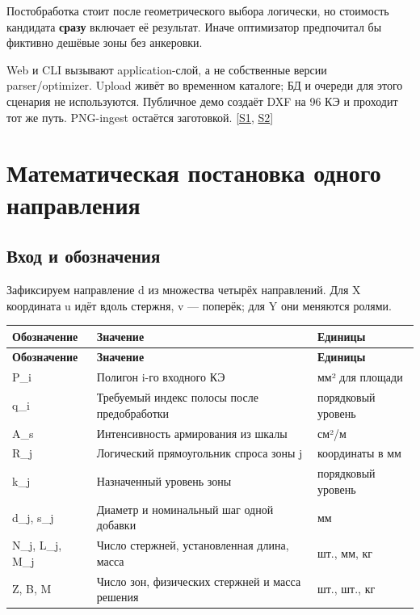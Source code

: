 \documentclass[11pt,a4paper]{article}
\begin{document}
Постобработка стоит после геометрического выбора логически, но стоимость кандидата \textbf{сразу} включает её результат. Иначе оптимизатор предпочитал бы фиктивно дешёвые зоны без анкеровки.


Web и CLI вызывают application-слой, а не собственные версии parser/optimizer. Upload живёт во временном каталоге; БД и очереди для этого сценария не используются. Публичное демо создаёт DXF на 96 КЭ и проходит тот же путь. PNG-ingest остаётся заготовкой. {\color{Teal}\small[\hyperlink{S1}{S1}, \hyperlink{S2}{S2}]}


\section{Математическая постановка одного направления}

\subsection{Вход и обозначения}

Зафиксируем направление d из множества четырёх направлений. Для X координата u идёт вдоль стержня, v — поперёк; для Y они меняются ролями.


{\small\setlength{\tabcolsep}{4pt}
\begin{longtable}{@{}L{41.178mm}L{63.351mm}L{53.848mm}@{}}
\toprule
\textbf{Обозначение} & \textbf{Значение} & \textbf{Единицы} \\
\midrule\endfirsthead
\toprule
\textbf{Обозначение} & \textbf{Значение} & \textbf{Единицы} \\
\midrule\endhead
\bottomrule\endfoot
P\_i & Полигон i-го входного КЭ & мм² для площади \\
q\_i & Требуемый индекс полосы после предобработки & порядковый уровень \\
A\_s & Интенсивность армирования из шкалы & см²/м \\
R\_j & Логический прямоугольник спроса зоны j & координаты в мм \\
k\_j & Назначенный уровень зоны & порядковый уровень \\
d\_j, s\_j & Диаметр и номинальный шаг одной добавки & мм \\
N\_j, L\_j, M\_j & Число стержней, установленная длина, масса & шт., мм, кг \\
Z, B, M & Число зон, физических стержней и масса решения & шт., шт., кг \\
\end{longtable}}
\end{document}
